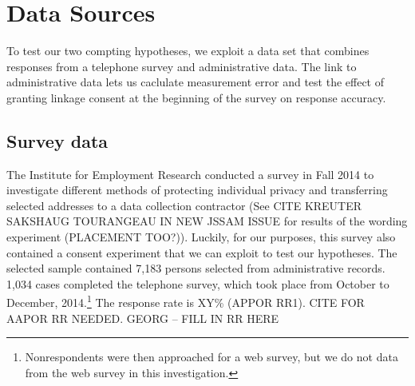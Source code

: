 


\section{Data Sources}
To test our two compting hypotheses, we exploit a data set that combines responses from a telephone survey and administrative data. The link to administrative data lets us caclulate measurement error and test the effect of granting linkage consent at the beginning of the survey on response accuracy.

\subsection {Survey data}\label{sec:survey}
The Institute for Employment Research conducted a survey in Fall 2014 to investigate different methods of protecting individual privacy and transferring selected addresses to a data collection contractor (See CITE KREUTER SAKSHAUG TOURANGEAU IN NEW JSSAM ISSUE for results of the wording experiment (PLACEMENT TOO?)). Luckily, for our purposes, this survey also contained a consent experiment that we can exploit to test our hypotheses. The selected sample contained 7,183 persons selected from administrative records. 1,034 cases completed the telephone survey, which took place from October to December, 2014.\footnote{Nonrespondents were then approached for a web survey, but we do not data from the web survey in this investigation.} The response rate is XY\% (APPOR RR1). CITE FOR AAPOR RR NEEDED. GEORG -- FILL IN RR HERE

